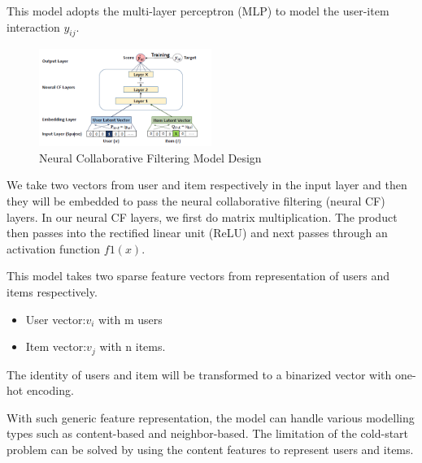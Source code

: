 \documentclass[final]{cvpr}
\begin{document}
This model adopts the multi-layer perceptron (MLP) to model the user-item interaction $y_{ij}$. 

\linebreak

\begin{figure}[h]
	\includegraphics[width=0.5\textwidth]{./NCF-network.PNG}
	\caption{Neural Collaborative Filtering Model Design \cite{NeuralCF}}
\end{figure}

We take two vectors from user and item respectively in the input layer and then they will be embedded to pass the neural collaborative filtering (neural CF) layers. In our neural CF layers, we first do matrix multiplication. The product then passes into the rectified linear unit (ReLU) and next passes through an activation function $f1(x)$.


This model takes two sparse feature vectors from representation of users and items respectively. 

\begin{itemize}
	\item User vector:$v_i$ with m users 
	\item Item vector:$v_j$ with n items.

\end{itemize}
The identity of users and item will be transformed to a binarized vector with one-hot encoding. 

With such generic feature representation, the model can handle various modelling types such as content-based and neighbor-based. The limitation of the cold-start problem can be solved by using the content features to represent users and items.

\end{document}
